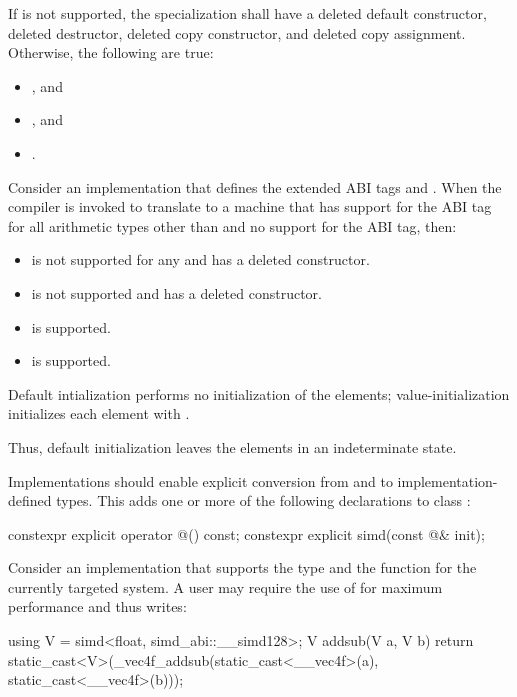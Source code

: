 If  is not supported, the specialization shall have a deleted default constructor, deleted destructor, deleted copy constructor, and deleted copy assignment.
Otherwise, the following are true:
\begin{itemize}
  \item {}, and
  \item {}, and
  \item {}.
\end{itemize}

\begin{example}
  Consider an implementation that defines the extended ABI tags  and . When the compiler is invoked to translate to a machine that has support for the  ABI tag for all arithmetic types other than  and no support for the  ABI tag, then:
  \begin{itemize}
    \item {} is not supported for any  and has a deleted constructor.
    \item {} is not supported and has a deleted constructor.
    \item {} is supported.
    \item {} is supported.
  \end{itemize}
\end{example}

\pnum
Default intialization performs no initialization of the elements; value-initialization initializes each element with . \begin{note}Thus, default initialization leaves the elements in an indeterminate state.\end{note}

\pnum
Implementations should enable explicit conversion from and to implementation-defined types. This adds one or more of the following declarations to class :

\begin{codeblock}
constexpr explicit operator @\impdef@() const;
constexpr explicit simd(const @\impdef@& init);
\end{codeblock}

\begin{example}
  Consider an implementation that supports the type  and the function  for the currently targeted system.
  A user may require the use of  for maximum performance and thus writes:
  \begin{codeblock}
    using V = simd<float, simd_abi::__simd128>;
    V addsub(V a, V b) {
      return static_cast<V>(_vec4f_addsub(static_cast<__vec4f>(a), static_cast<__vec4f>(b)));
    }
  \end{codeblock}
\end{example}


